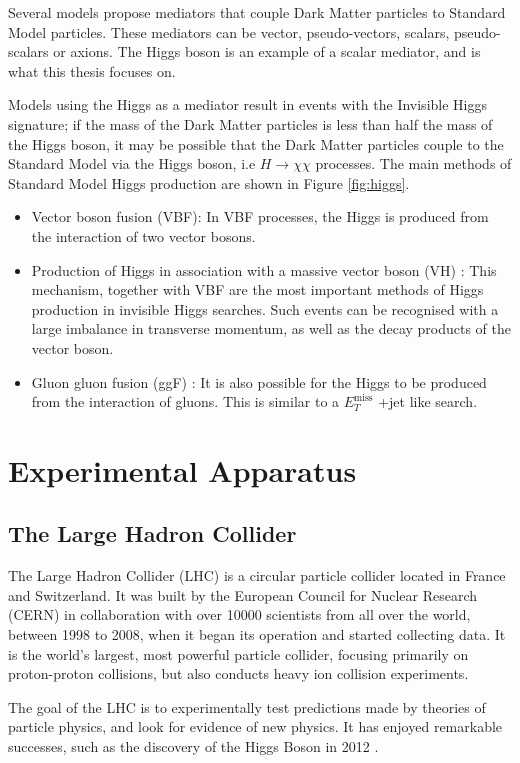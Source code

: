 \documentclass[12pt,a4paper,openright,twoside]{report}
\newcommand{\met}{$E_T^{\mathrm{miss}}$ }
\begin{document}
Several models propose mediators that couple Dark Matter particles to Standard Model particles. These mediators can be vector, pseudo-vectors, scalars, pseudo-scalars or axions. The Higgs boson is an example of a scalar mediator, and is what this thesis focuses on. 

Models using the Higgs as a mediator result in events with the Invisible Higgs signature; if the mass of the Dark Matter particles is less than half the mass of the Higgs boson, it may be possible that the Dark Matter particles couple to the Standard Model via the Higgs boson, i.e $H\to\chi\chi$ processes. The main methods of Standard Model Higgs production are shown in Figure \ref{fig:higgs}.
	\begin{itemize}
	\item Vector boson fusion (VBF): In VBF processes, the Higgs is produced from the interaction of two vector bosons.
	\item Production of Higgs in association with a massive vector boson (VH) : This mechanism, together with VBF are the most important methods of Higgs production in invisible Higgs searches. Such events can be recognised with a large imbalance in transverse momentum, as well as the decay products of the vector boson.
	\item Gluon gluon fusion (ggF) : It is also possible for the Higgs to be produced from the interaction of gluons. This is similar to a \met+jet like search.
	\end{itemize}

\chapter{Experimental Apparatus}\label{ch:LHC}

\section{The Large Hadron Collider}
The Large Hadron Collider (LHC) is a circular particle collider located in France and Switzerland. It was built by the European Council for Nuclear Research (CERN) in collaboration with over 10000 scientists from all over the world, between 1998 to 2008, when it began its operation and started collecting data. It is the world's largest, most powerful particle collider, focusing primarily on proton-proton collisions, but also conducts heavy ion collision experiments.

The goal of the LHC is to experimentally test predictions made by theories of particle physics, and look for evidence of new physics. It has enjoyed remarkable successes, such as the discovery of the Higgs Boson in 2012 \cite{Higgs,Higgs2}.
\end{document}
